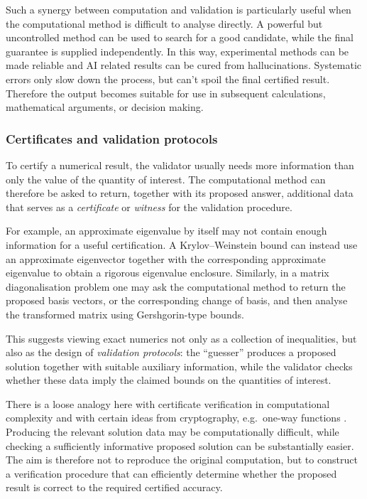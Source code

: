 \documentclass{article}
\theoremstyle{definition}
\begin{document}
Such a synergy between computation and validation is particularly useful when the computational method is difficult to analyse directly. A powerful but uncontrolled method can be used to search for a good candidate, while the final guarantee is supplied independently. In this way, experimental methods can be made reliable and AI related results can be cured from hallucinations.
Systematic errors only slow down the process, but can't spoil the final certified result.
Therefore the output becomes suitable for use in subsequent calculations, mathematical arguments, or decision making.

\subsubsection{Certificates and validation protocols}

To certify a numerical result, the validator usually needs more information than only the value of the quantity of interest. The computational method can therefore be asked to return, together with its proposed answer, additional data that serves as a \emph{certificate} or \emph{witness} \cite{paper:McConnell2011} for the validation procedure.

For example, an approximate eigenvalue by itself may not contain enough information for a useful certification. A Krylov--Weinstein bound can instead use an approximate eigenvector together with the corresponding approximate eigenvalue to obtain a rigorous eigenvalue enclosure. Similarly, in a matrix diagonalisation problem one may ask the computational method to return the proposed basis vectors, or the corresponding change of basis, and then analyse the transformed matrix using Gershgorin-type bounds.

This suggests viewing exact numerics not only as a collection of inequalities, but also as the design of \emph{validation protocols}: the ``guesser'' produces a proposed solution together with suitable auxiliary information, while the validator checks whether these data imply the claimed bounds on the quantities of interest.

There is a loose analogy here with certificate verification in computational complexity and with certain ideas from cryptography, e.g.\ one-way functions \cite{book:AroraBarakComplexity,review:GoldreichCryptoPrimer}. Producing the relevant solution data may be computationally difficult, while checking a sufficiently informative proposed solution can be substantially easier. The aim is therefore not to reproduce the original computation, but to construct a verification procedure that can efficiently determine whether the proposed result is correct to the required certified accuracy.
\end{document}
